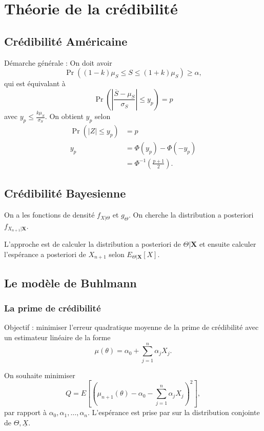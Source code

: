\part{Théorie de la crédibilité}

\chapter{Crédibilité Américaine}

Démarche générale : On doit avoir 
$$\Pr((1-k) \mu_S \leq S \leq (1 + k)\mu_S) \geq \alpha,$$
qui est équivalant à 
$$\Pr\left(\left| \frac{\overline{S} - \mu_S}{\sigma_S} \right| \leq y_p\right) = p$$
avec $y_p \leq \frac{k\mu_S}{\sigma_S}$. On obtient $y_p$ selon
\begin{align*}
	\Pr(|Z| \leq y_p) &= p\\
	y_p &= \Phi(y_p) - \Phi(-y_p)\\
	&= \Phi ^{-1}\left(\frac{p + 1}{2}\right).
\end{align*}

\chapter{Crédibilité Bayesienne}

On a les fonctions de densité $f_{X \vert \Theta}$ et $g_\Theta$. On cherche la distribution a posteriori $f_{X_{n+1} \vert \boldsymbol{X}}$. 

L'approche est de calculer la distribution a posteriori de $\Theta \vert \boldsymbol{X}$ et ensuite calculer l'espérance a posteriori de $X_{n+1}$ selon $E_{\Theta \vert \boldsymbol{X}}[X]$.

\chapter{Le modèle de Buhlmann}

\section{La prime de crédibilité}

Objectif : minimiser l'erreur quadratique moyenne de la prime de crédibilité avec un estimateur linéaire de la forme $$\mu(\theta) = \alpha_0 + \sum_{j = 1}^{n}\alpha_j X_j.$$

On souhaite minimiser $$Q = E\left[ \left(\mu_{n+1}(\theta) - \alpha_0 - \sum_{j = 1}^{n}\alpha_j X_j\right)^2\right],$$
par rapport à $\alpha_0, \alpha_1, \dots, \alpha_n$. L'espérance est prise par sur la distribution conjointe de $\Theta, \underline{X}$. 

